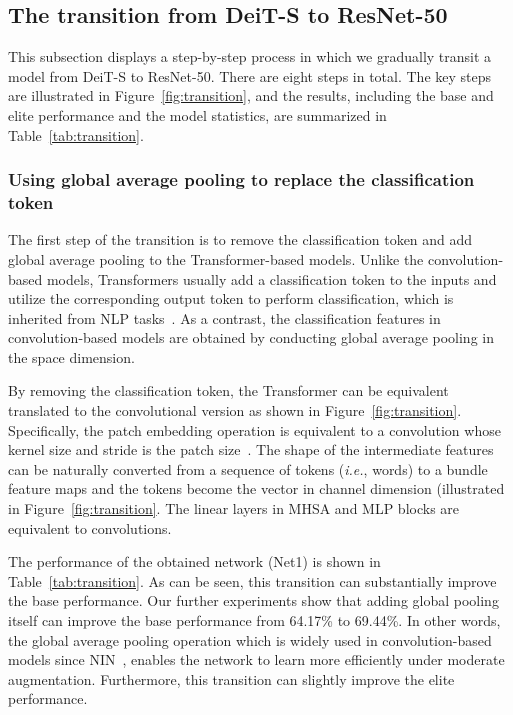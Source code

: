 \documentclass[10pt,twocolumn,letterpaper]{article}
\begin{document}
\subsection{The transition from DeiT-S to ResNet-50}
\label{methodology:transition}

This subsection displays a step-by-step process in which we gradually transit a model from DeiT-S to ResNet-50. There are eight steps in total. The key steps are illustrated in Figure~\ref{fig:transition}, and the results, including the base and elite performance and the model statistics, are summarized in Table~\ref{tab:transition}.

\subsubsection{Using global average pooling to replace the classification token}
\label{methodology:transition:token}

The first step of the transition is to remove the classification token and add global average pooling to the Transformer-based models. Unlike the convolution-based models, Transformers usually add a classification token to the inputs and utilize the corresponding output token to perform classification, which is inherited from NLP tasks~\cite{devlin2018bert}. As a contrast, the classification features in convolution-based models are obtained by conducting global average pooling in the space dimension. 

By removing the classification token, the Transformer can be equivalent translated to the convolutional version as shown in Figure~\ref{fig:transition}. Specifically, the patch embedding operation is equivalent to a convolution whose kernel size and stride is the patch size~\cite{dosovitskiy2020image}. The shape of the intermediate features can be naturally converted from a sequence of tokens (\textit{i.e.}, words) to a bundle feature maps and the tokens become the vector in channel dimension (illustrated in Figure~\ref{fig:transition}. The linear layers in MHSA and MLP blocks are equivalent to  convolutions.

The performance of the obtained network (Net1) is shown in Table~\ref{tab:transition}. As can be seen, this transition can substantially improve the base performance. Our further experiments show that adding global pooling itself can improve the base performance from 64.17\% to 69.44\%. In other words, the global average pooling operation which is widely used in convolution-based models since NIN~\cite{lin2013network}, enables the network to learn more efficiently under moderate augmentation. Furthermore, this transition can slightly improve the elite performance.
\end{document}
